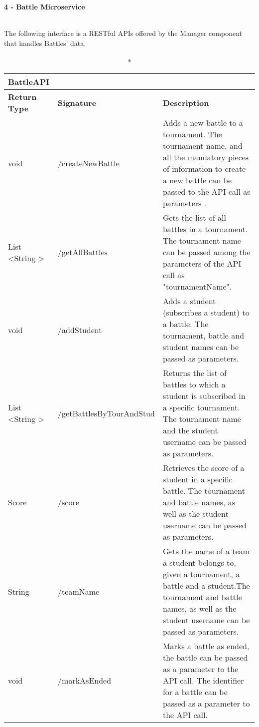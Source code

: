\begin{large}{\textbf{4 - Battle Microservice}}\end{large}\\
The following interface is a RESTful APIs offered by the Manager component that handles Battles' data.
\begin{longtable}{|p{2.5cm} p{6.5cm} p{4.5cm}|}
	\caption*{BattleAPI}\\ 
	
	\hline
	\textbf{Return Type} & \textbf{Signature} & \textbf{Description}\\
	\hline \endhead
	
	void & /createNewBattle  & Adds a new battle to a tournament. The tournament name, and all the mandatory pieces of information to create a new battle can be passed to the API call as parameters .\\
	
	List \textless String \textgreater & /getAllBattles & Gets the list of all battles in a tournament. The tournament name can be passed among the parameters of the API call as "tournamentName".\\
	
	void &/addStudent & Adds a student (subscribes a student) to a battle. The tournament, battle and student names can be passed as parameters.\\
	
	List \textless String \textgreater & /getBattlesByTourAndStud & Returns the list of battles to which a student is subscribed in a specific tournament. The tournament name and the student username can be passed as parameters.\\
	
	Score & /score & Retrieves the score of a student in a specific battle. The tournament and battle names, as well as the student username can be passed as parameters.\\
	
	String & /teamName & Gets the name of a team a student belongs to, given a tournament, a battle and a student.The tournament and battle names, as well as the student username can be passed as parameters.\\
	
	void & /markAsEnded & Marks a battle as ended, the battle can be passed as a parameter to the API call. The identifier for a battle can be passed as a parameter to the API call.\\
	

\end{longtable}
